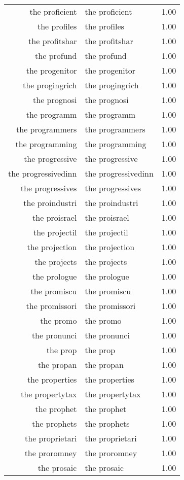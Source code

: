 \begin{table}[ht]
\begin{tabular}{rlr}
  the proficient & the proficient & 1.00 \\ 
  the profiles & the profiles & 1.00 \\ 
  the profitshar & the profitshar & 1.00 \\ 
  the profund & the profund & 1.00 \\ 
  the progenitor & the progenitor & 1.00 \\ 
  the progingrich & the progingrich & 1.00 \\ 
  the prognosi & the prognosi & 1.00 \\ 
  the programm & the programm & 1.00 \\ 
  the programmers & the programmers & 1.00 \\ 
  the programming & the programming & 1.00 \\ 
  the progressive & the progressive & 1.00 \\ 
  the progressivedinn & the progressivedinn & 1.00 \\ 
  the progressives & the progressives & 1.00 \\ 
  the proindustri & the proindustri & 1.00 \\ 
  the proisrael & the proisrael & 1.00 \\ 
  the projectil & the projectil & 1.00 \\ 
  the projection & the projection & 1.00 \\ 
  the projects & the projects & 1.00 \\ 
  the prologue & the prologue & 1.00 \\ 
  the promiscu & the promiscu & 1.00 \\ 
  the promissori & the promissori & 1.00 \\ 
  the promo & the promo & 1.00 \\ 
  the pronunci & the pronunci & 1.00 \\ 
  the prop & the prop & 1.00 \\ 
  the propan & the propan & 1.00 \\ 
  the properties & the properties & 1.00 \\ 
  the propertytax & the propertytax & 1.00 \\ 
  the prophet & the prophet & 1.00 \\ 
  the prophets & the prophets & 1.00 \\ 
  the proprietari & the proprietari & 1.00 \\ 
  the proromney & the proromney & 1.00 \\ 
  the prosaic & the prosaic & 1.00 \\ 

\end{tabular}
\end{table}
